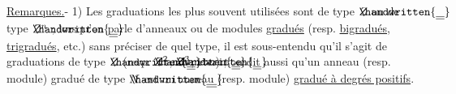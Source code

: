 \uline{Remarques.}- 1) Les graduations les plus souvent utilisées sont de type $\rlap{\ensuremath{\handwritten{\underline{\underline{\phantom{Z}}}}}}Z$ ou de type $\rlap{\ensuremath{\handwritten{\underline{\underline{\phantom{Z}}}}}}Z^n$ ; lorsqu'on parle d'anneaux ou de modules \uline{gradués} (resp. \uline{bigradués}, \uline{trigradués}, etc.) sans préciser de quel type, il est sous-entendu qu'il s'agit de graduations de type $\rlap{\ensuremath{\handwritten{\underline{\underline{\phantom{Z}}}}}}Z$ (resp. $\rlap{\ensuremath{\handwritten{\underline{\underline{\phantom{Z}}}}}}Z^2$, $\rlap{\ensuremath{\handwritten{\underline{\underline{\phantom{Z}}}}}}Z^3$, etc.) ; on dit aussi qu'un anneau (resp. module) gradué de type $\rlap{\ensuremath{\handwritten{\underline{\underline{\phantom{N}}}}}}N$ est un anneau (resp. module) \uline{gradué à degrés positifs}.

